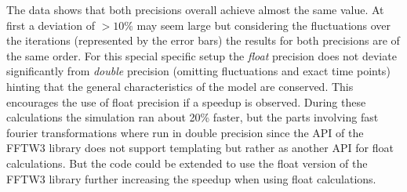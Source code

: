 \documentclass[master.tex]{subfiles}
\begin{document}
The data shows that both precisions overall achieve almost the same value. At first a deviation of $>10\%$ may seem large but considering the fluctuations over the iterations (represented by the error bars) the results for both precisions are of the same order. For this special specific setup the \textit{float} precision does not deviate significantly from \textit{double} precision (omitting fluctuations and exact time points) hinting that the general characteristics of the model are conserved. This encourages the use of float precision if a speedup is observed. During these calculations the simulation ran about 20\% faster, but the parts involving fast fourier transformations where run in double precision since the API of the FFTW3 library does not support templating but rather as another API for float calculations. But the code could be extended to use the float version of the FFTW3 library further increasing the speedup when using float calculations. 
\end{document}
